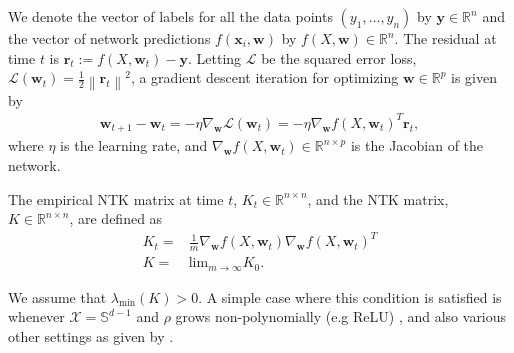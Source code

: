 \documentclass[10pt]{article} %
\theoremstyle{plain}
\theoremstyle{definition}
\theoremstyle{remark}
\newcommand{\Real}{\mathbb{R}}
\newcommand{\norm}[1]{\left\lVert#1\right\rVert}
\newcommand{\x}{\mathbf{x}}
\newcommand{\calx}{\mathcal{X}}
\newcommand{\y}{\mathbf{y}}
\newcommand{\res}{\mathbf{r}}
\newcommand{\w}{\mathbf{w}}
\newcommand{\calL}{\mathcal{L}}
\begin{document}
We denote the vector of labels for all the data points  $(y_1, \ldots,y_n)$  by $\y\in \Real^n$ and the vector of network predictions $f(\x_i,\w)$  by $f(X,\w) \in \Real^n$.  The residual at time $t$ is $\res_t:=f(X,\w_t)-\y$. Letting $\calL$ be the squared error loss, $\calL(\w_{t})=\frac{1}{2}\norm{\res_t}^2$, a gradient descent iteration for optimizing $\w \in \Real^p$ is given by
\begin{align}\label{eq:GD_NN}
    \w_{t+1} - \w_{t} = - \eta \nabla_\w \calL(\w_{t}) = -\eta \nabla_\w f(X,\w_t)^T\res_t,
\end{align}
where $\eta$ is the learning rate, and  $\nabla_\w f(X,\w_t)\in \Real^{n\times p}$ is the Jacobian of the network. 


The empirical NTK matrix at time $t$, $K_t\in \Real^{n\times n}$, and the NTK matrix, $K\in \Real^{n\times n}$, are defined as 
\begin{align}\label{def:ntk}
    K_t =& \frac{1}{m}\nabla_\w f(X,\w_t)\nabla_\w f(X,\w_t)^T \\
    K =& \text{lim}_{m\rightarrow \infty}K_{0}.
\end{align}

We assume that $\lambda_{\min}(K) > 0$. A simple case where this condition is satisfied is whenever $\calx = \mathbb{S}^{d-1}$ and $\rho$ grows non-polynomially (e.g ReLU) \cite{jacot2018neural}, and also various other settings as given by \cite{oymak2020toward, wang2021deformed, nguyen2021tight, montanari2022interpolation, barzilai2023generalization}.
\end{document}
